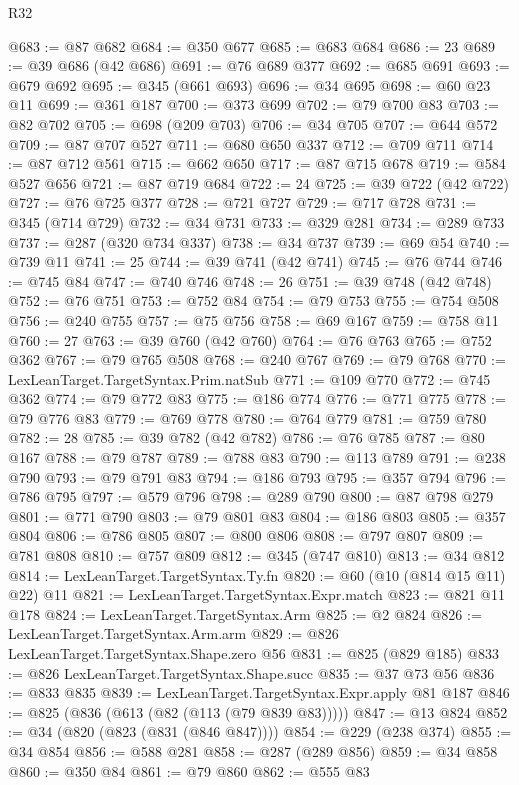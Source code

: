 \begin{lexlean}{R32}
\begin{coremodule}
@683 := @87 @682
@684 := @350 @677
@685 := @683 @684
@686 := 23
@689 := @39 @686 (@42 @686)
@691 := @76 @689 @377
@692 := @685 @691
@693 := @679 @692
@695 := @345 (@661 @693)
@696 := @34 @695
@698 := @60 @23 @11
@699 := @361 @187
@700 := @373 @699
@702 := @79 @700 @83
@703 := @82 @702
@705 := @698 (@209 @703)
@706 := @34 @705
@707 := @644 @572
@709 := @87 @707 @527
@711 := @680 @650 @337
@712 := @709 @711
@714 := @87 @712 @561
@715 := @662 @650
@717 := @87 @715 @678
@719 := @584 @527 @656
@721 := @87 @719 @684
@722 := 24
@725 := @39 @722 (@42 @722)
@727 := @76 @725 @377
@728 := @721 @727
@729 := @717 @728
@731 := @345 (@714 @729)
@732 := @34 @731
@733 := @329 @281
@734 := @289 @733
@737 := @287 (@320 @734 @337)
@738 := @34 @737
@739 := @69 @54
@740 := @739 @11
@741 := 25
@744 := @39 @741 (@42 @741)
@745 := @76 @744
@746 := @745 @84
@747 := @740 @746
@748 := 26
@751 := @39 @748 (@42 @748)
@752 := @76 @751
@753 := @752 @84
@754 := @79 @753
@755 := @754 @508
@756 := @240 @755
@757 := @75 @756
@758 := @69 @167
@759 := @758 @11
@760 := 27
@763 := @39 @760 (@42 @760)
@764 := @76 @763
@765 := @752 @362
@767 := @79 @765 @508
@768 := @240 @767
@769 := @79 @768
@770 := LexLeanTarget.TargetSyntax.Prim.natSub
@771 := @109 @770
@772 := @745 @362
@774 := @79 @772 @83
@775 := @186 @774
@776 := @771 @775
@778 := @79 @776 @83
@779 := @769 @778
@780 := @764 @779
@781 := @759 @780
@782 := 28
@785 := @39 @782 (@42 @782)
@786 := @76 @785
@787 := @80 @167
@788 := @79 @787
@789 := @788 @83
@790 := @113 @789
@791 := @238 @790
@793 := @79 @791 @83
@794 := @186 @793
@795 := @357 @794
@796 := @786 @795
@797 := @579 @796
@798 := @289 @790
@800 := @87 @798 @279
@801 := @771 @790
@803 := @79 @801 @83
@804 := @186 @803
@805 := @357 @804
@806 := @786 @805
@807 := @800 @806
@808 := @797 @807
@809 := @781 @808
@810 := @757 @809
@812 := @345 (@747 @810)
@813 := @34 @812
@814 := LexLeanTarget.TargetSyntax.Ty.fn
@820 := @60 (@10 (@814 @15 @11) @22) @11
@821 := LexLeanTarget.TargetSyntax.Expr.match
@823 := @821 @11 @178
@824 := LexLeanTarget.TargetSyntax.Arm
@825 := @2 @824
@826 := LexLeanTarget.TargetSyntax.Arm.arm
@829 := @826 LexLeanTarget.TargetSyntax.Shape.zero @56
@831 := @825 (@829 @185)
@833 := @826 LexLeanTarget.TargetSyntax.Shape.succ
@835 := @37 @73 @56
@836 := @833 @835
@839 := LexLeanTarget.TargetSyntax.Expr.apply @81 @187
@846 := @825 (@836 (@613 (@82 (@113 (@79 @839 @83)))))
@847 := @13 @824
@852 := @34 (@820 (@823 (@831 (@846 @847))))
@854 := @229 (@238 @374)
@855 := @34 @854
@856 := @588 @281
@858 := @287 (@289 @856)
@859 := @34 @858
@860 := @350 @84
@861 := @79 @860
@862 := @555 @83

\end{coremodule}
\end{lexlean}
